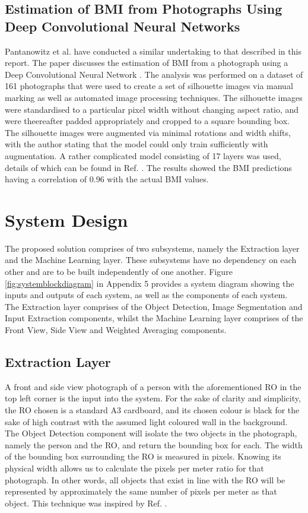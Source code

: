 \documentclass[conference]{IEEEtran}
\begin{document}
\subsection{Estimation of BMI from Photographs Using Deep Convolutional Neural Networks}
Pantanowitz et al. have conducted a similar undertaking to that described in this report.
The paper discusses the estimation of BMI from a photograph using a Deep Convolutional Neural Network \cite{bmifromphoto}.
The analysis was performed on a dataset of 161 photographs that were used to create a set of silhouette images via manual marking as well as automated image processing techniques.
The silhouette images were standardised to a particular pixel width without changing aspect ratio, and were theereafter padded appropriately and cropped to a square bounding box.
The silhouette images were augmented via minimal rotations and width shifts, with the author stating that the model could only train sufficiently with augmentation.
A rather complicated model consisting of 17 layers was used, details of which can be found in Ref. \cite{bmifromphoto}.
The results showed the BMI predictions having a correlation of 0.96 with the actual BMI values.

\section{System Design}
The proposed solution comprises of two subsystems, namely the Extraction layer and the Machine Learning layer.
These subsystems have no dependency on each other and are to be built independently of one another.
Figure \ref{fig:systemblockdiagram} in Appendix 5 provides a system diagram showing the inputs and outputs of each system, as well as the components of each system.
The Extraction layer comprises of the Object Detection, Image Segmentation and Input Extraction components, whilst the Machine Learning layer comprises of the Front View, Side View and Weighted Averaging components.
\subsection{Extraction Layer}
A front and side view photograph of a person with the aforementioned RO in the top left corner is the input into the system.
For the sake of clarity and simplicity, the RO chosen is a standard A3 cardboard, and its chosen colour is black for the sake of high contrast with the assumed light coloured wall in the background.
The Object Detection component will isolate the two objects in the photograph, namely the person and the RO, and return the bounding box for each.
The width of the bounding box surrounding the RO is measured in pixels.
Knowing its physical width allows us to calculate the pixels per meter ratio for that photograph.
In other words, all objects that exist in line with the RO will be represented by approximately the same number of pixels per meter as that object.
This technique was inspired by Ref. \cite{objectDetection}.
\end{document}
